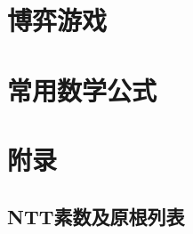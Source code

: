\documentclass[a4paper,openany]{book}
\begin{document}
\begin{spacing}{0.9}
		\section{博弈游戏}
		
		\section{常用数学公式}
		
		\section{附录}
		\subsection{NTT素数及原根列表}
		
		
	\end{spacing}
\end{document}
